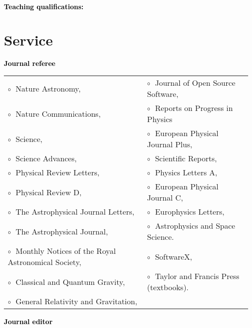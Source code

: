 \vspace{0.2cm}
\textbf{\textcolor{black}{Teaching qualifications:}}\vspace{0.05cm}\\




\section{Service}




\textbf{\textcolor{black}{Journal referee}}\vspace{0.1cm}\\
\begin{tabular}{@{\hskip 0.4cm}l@{\hskip 0.4in}l}
$\circ\;$ Nature Astronomy,  & $\circ\;$     Journal of Open Source Software, \\
$\circ\;$ Nature Communications,  & $\circ\;$  Reports on Progress in Physics   \\
$\circ\;$ Science, & $\circ\;$  European Physical Journal Plus,  \\
$\circ\;$ Science Advances, & $\circ\;$ Scientific Reports, \\
$\circ\;$ Physical Review Letters, & $\circ\;$ Physics Letters A, \\
$\circ\;$ Physical Review D,  & $\circ\;$ European Physical Journal C,  \\
$\circ\;$  The Astrophysical Journal Letters,  &  $\circ\;$  Europhysics Letters, \\
$\circ\;$ The Astrophysical Journal,  &  $\circ\;$ Astrophysics and Space Science. \\
$\circ\;$  Monthly Notices of the Royal Astronomical Society, & $\circ\;$ SoftwareX, \\
$\circ\;$  Classical and Quantum Gravity, & $\circ\;$ Taylor and Francis Press (textbooks). \\
$\circ\;$  General Relativity and Gravitation, & \\
\end{tabular}
\vspace{0.2cm}




 \textbf{\textcolor{black}{Journal editor}}\vspace{0.1cm}\\
 \vspace{-0.1cm}
\vspace{0.2cm}


